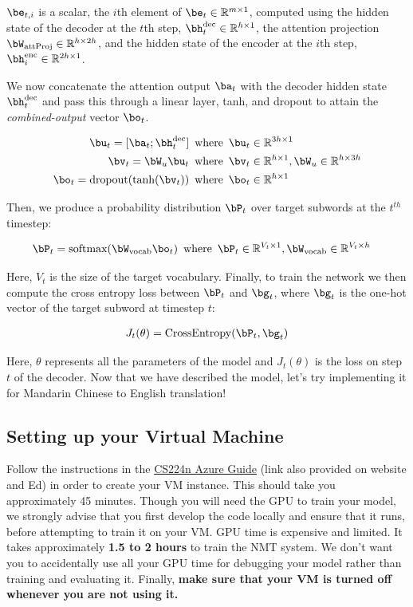 $\be_{t, i}$ is a scalar, the $i$th element of $\be_{t} \in \Real^{m \times 1}$, computed using the hidden state of the decoder at the $t$th step, $\hdec_t \in \Real^{h \times 1}$, the attention projection $\bW_{\text{attProj}} \in \Real^{h \times 2h}$, and the hidden state of the encoder at the $i$th step, $\henc_i \in \Real^{2h \times 1}$.

We now concatenate the attention output $\ba_t$ with the decoder hidden state $\hdec_t$ and pass this through a linear layer, tanh, and dropout to attain the \textit{combined-output} vector $\bo_{t}$.

\begin{align}   
    \bu_{t} = [\ba_{t}; \hdec_t] \enspace &\text{where} \enspace \bu_t \in  \Real^{3h \times 1} \\
    \bv_t = \bW_{u}\bu_t \enspace &\text{where} \enspace \bv_t \in \Real^{h \times 1}, \bW_{u} \in \Real^{h \times 3h}\\
    \bo_t = \text{dropout}(\text{tanh}(\bv_t)) \enspace &\text{where} \enspace \bo_t \in \Real^{h \times 1}
\end{align}

Then, we produce a probability distribution $\bP_t$ over target subwords at the $t^{th}$ timestep:

\begin{align}
    \bP_t = \text{softmax}(\bW_{\text{vocab}}\bo_{t}) \enspace &\text{where} \enspace \bP_t \in \Real^{V_{t} \times 1}, \bW_{\text{vocab}} \in \Real^{V_{t} \times h}
\end{align}

Here, $V_{t}$ is the size of the target vocabulary. Finally, to train the network we then compute the cross entropy loss between $\bP_t$ and $\bg_{t}$, where $\bg_{t}$ is the one-hot vector of the target subword at timestep $t$:

\begin{align}
    J_t(\theta) = \mathrm{CrossEntropy}(\bP_t,\bg_{t})
\end{align}

Here, $\theta$ represents all the parameters of the model and $J_t(\theta)$ is the loss on step $t$ of the decoder.
Now that we have described the model, let's try implementing it for Mandarin Chinese to English translation!

\subsection*{Setting up your Virtual Machine}
Follow the instructions in the \href{https://docs.google.com/document/d/11kRyfClhTi4-MC1feWWCMI31fHpTzddASsDa48_Dd9E/edit?usp=sharing}{CS224n Azure Guide} (link also provided on website and Ed) in order to create your VM instance. This should take you approximately 45 minutes. Though you will need the GPU to train your model, we strongly advise that you first develop the code locally and ensure that it runs, before attempting to train it on your VM. GPU time is expensive and limited. It takes approximately \textbf{1.5 to 2 hours} to train the NMT system. We don't want you to accidentally use all your GPU time for debugging your model rather than training and evaluating it. Finally, \textbf{make sure that your VM is turned off whenever you are not using it.}

